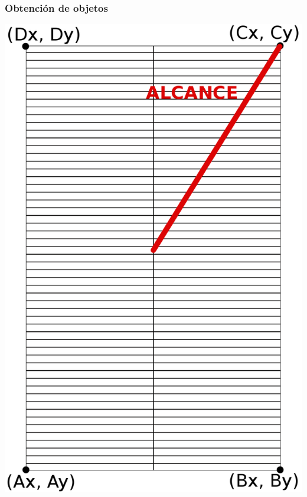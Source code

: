 \begin{frame}
    \frametitle{Obtención de objetos}
    \endblock{}
		\begin{center}
    \includegraphics[height=0.8\textheight]{FIGURES/CSU-vertices}
		\end{center}
\end{frame}






